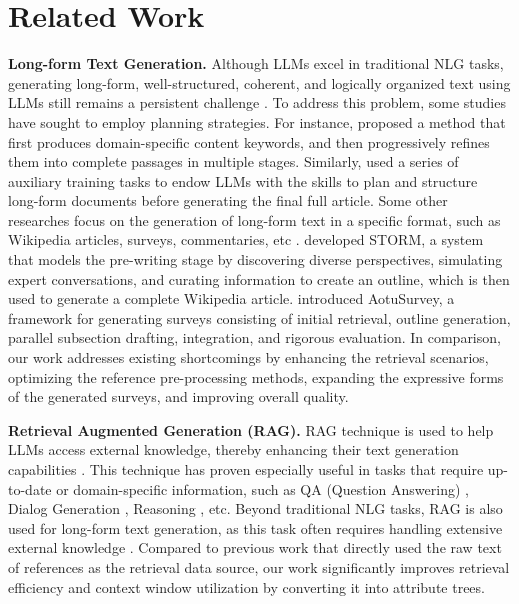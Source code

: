 \section{Related Work}
\textbf{Long-form Text Generation.}
Although LLMs excel in traditional NLG tasks, generating long-form, well-structured, coherent, and logically organized text using LLMs still remains a persistent challenge \cite{tan2024proxyqa,kumar2024longlamp,wu2024spinning,min-etal-2023-factscore,que2024hellobench,dong-etal-2024-bamboo,tang-etal-2023-enhancing}. To address this problem, some studies have sought to employ planning strategies. For instance, \citet{tan-etal-2021-progressive} proposed a method that first produces domain-specific content keywords, and then progressively refines them into complete passages in multiple stages. Similarly, \citet{liang2024integrating} used a series of auxiliary training tasks to endow LLMs with the skills to plan and structure long-form documents before generating the final full article. Some other researches focus on the generation of long-form text in a specific format, such as Wikipedia articles, surveys, commentaries, etc \cite{zhang2024retrieval, wu2024automated, tang-etal-2022-etrica,tang-etal-2023-improving}. \citet{shao-etal-2024-assisting} developed STORM, a system that models the pre-writing stage by discovering diverse perspectives, simulating expert conversations, and curating information to create an outline, which is then used to generate a complete Wikipedia article. \citet{AutoSurvey_24_NIPS_Westlake} introduced AotuSurvey, a framework for generating surveys consisting of initial retrieval, outline generation, parallel subsection drafting, integration, and rigorous evaluation. In comparison, our work addresses existing shortcomings by enhancing the retrieval scenarios, optimizing the reference pre-processing methods, expanding the expressive forms of the generated surveys, and improving overall quality.

\textbf{Retrieval Augmented Generation (RAG).}
RAG technique is used to help LLMs access external knowledge, thereby enhancing their text generation capabilities \cite{gao2023retrieval, fan2024survey, huang2024survey, hu2024rag}. This technique has proven especially useful in tasks that require up-to-date or domain-specific information, such as QA (Question Answering) \cite{ke-etal-2024-bridging,asai2024selfrag}, Dialog Generation \cite{rajput2024recommender,linra}, Reasoning \cite{cheng-etal-2023-uprise,zhang-etal-2023-iag}, etc. Beyond traditional NLG tasks, RAG is also used for long-form text generation, as this task often requires handling extensive external knowledge \cite{AutoSurvey_24_NIPS_Westlake,shao-etal-2024-assisting,zhang-etal-2023-iag}. Compared to previous work that directly used the raw text of references as the retrieval data source, our work significantly improves retrieval efficiency and context window utilization by converting it into attribute trees.